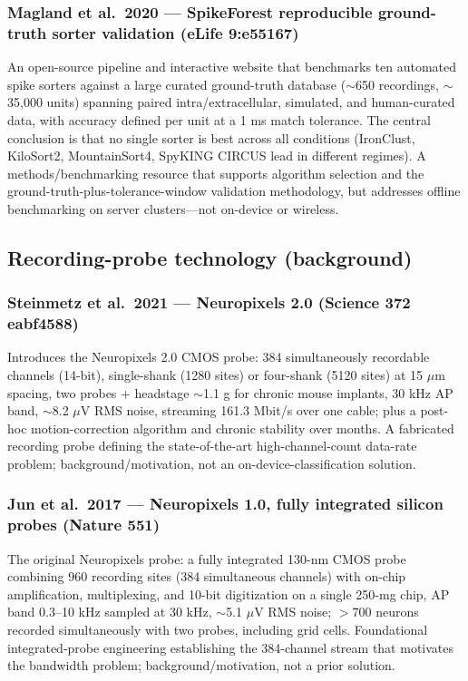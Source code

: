 \documentclass[11pt]{article}
\begin{document}
\subsubsection*{Magland et al.\ 2020 --- SpikeForest reproducible ground-truth sorter validation (eLife 9:e55167)}
An open-source pipeline and interactive website that benchmarks ten automated spike sorters against a large curated ground-truth database ($\sim$650 recordings, $\sim$35{,}000 units) spanning paired intra/extracellular, simulated, and human-curated data, with accuracy defined per unit at a 1 ms match tolerance. The central conclusion is that no single sorter is best across all conditions (IronClust, KiloSort2, MountainSort4, SpyKING CIRCUS lead in different regimes). A methods/benchmarking resource that supports algorithm selection and the ground-truth-plus-tolerance-window validation methodology, but addresses offline benchmarking on server clusters---not on-device or wireless.

\subsection*{Recording-probe technology (background)}

\subsubsection*{Steinmetz et al.\ 2021 --- Neuropixels 2.0 (Science 372 eabf4588)}
Introduces the Neuropixels 2.0 CMOS probe: 384 simultaneously recordable channels (14-bit), single-shank (1280 sites) or four-shank (5120 sites) at 15 $\mu$m spacing, two probes + headstage $\sim$1.1 g for chronic mouse implants, 30 kHz AP band, $\sim$8.2 $\mu$V RMS noise, streaming 161.3 Mbit/s over one cable; plus a post-hoc motion-correction algorithm and chronic stability over months. A fabricated recording probe defining the state-of-the-art high-channel-count data-rate problem; background/motivation, not an on-device-classification solution.

\subsubsection*{Jun et al.\ 2017 --- Neuropixels 1.0, fully integrated silicon probes (Nature 551)}
The original Neuropixels probe: a fully integrated 130-nm CMOS probe combining 960 recording sites (384 simultaneous channels) with on-chip amplification, multiplexing, and 10-bit digitization on a single 250-mg chip, AP band 0.3--10 kHz sampled at 30 kHz, $\sim$5.1 $\mu$V RMS noise; $>$700 neurons recorded simultaneously with two probes, including grid cells. Foundational integrated-probe engineering establishing the 384-channel stream that motivates the bandwidth problem; background/motivation, not a prior solution.
\end{document}
